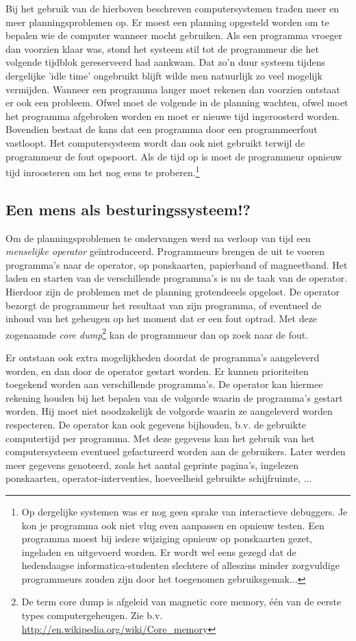 Bij het gebruik van de hierboven beschreven computersystemen
traden meer en meer planningsproblemen op. Er moest een planning
opgesteld worden om te bepalen wie de computer wanneer mocht
gebruiken. Als een programma vroeger dan voorzien klaar was, stond het
systeem stil tot de programmeur die het volgende tijdblok gereserveerd
had aankwam. Dat zo'n duur systeem tijdens dergelijke 'idle time'
ongebruikt blijft wilde men natuurlijk zo veel mogelijk vermijden.
Wanneer een programma langer moet rekenen dan voorzien ontstaat er ook
een probleem. Ofwel moet de volgende in de planning wachten, ofwel
moet het programma afgebroken worden en moet er nieuwe tijd
ingeroosterd worden. Bovendien bestaat de kans dat een programma door
een programmeerfout vastloopt. Het computersysteem wordt dan ook niet
gebruikt terwijl de programmeur de fout opspoort. Als de tijd op is
moet de programmeur opnieuw tijd inroosteren om het nog eens te
proberen.\footnote{Op dergelijke systemen was er nog geen sprake van
interactieve debuggers. Je kon je programma ook niet vlug even
aanpassen en opnieuw testen. Een programma moest bij iedere
wijziging opnieuw op ponskaarten gezet, ingeladen en uitgevoerd
worden. Er wordt wel eens gezegd dat de hedendaagse
informatica-studenten slechtere of alleszins minder zorgvuldige
programmeurs zouden zijn door het toegenomen
gebruiksgemak...}

\subsection{Een mens als besturingssysteem!?}

Om de planningsproblemen te ondervangen werd na verloop van tijd
een \emph{menselijke operator} ge\"introduceerd.
Programmeurs brengen de uit te voeren programma's naar de operator, op
ponskaarten, papierband of magneetband. Het laden en starten van de
verschillende programma's is nu de taak van de operator. Hierdoor zijn
de problemen met de planning grotendeeels opgelost. De operator
bezorgt de programmeur het resultaat van zijn programma, of eventueel
de inhoud van het geheugen op het moment dat er een fout optrad. Met
deze zogenaamde \emph{core dump}\footnote{De term core dump is
afgeleid van magnetic core memory, \'e\'en van de eerste types computergeheugen.
Zie b.v. \url{http://en.wikipedia.org/wiki/Core_memory}}
kan de programmeur dan op zoek naar de fout.

Er ontstaan ook extra mogelijkheden doordat de programma's
aangeleverd worden, en dan door de operator gestart worden. Er kunnen
prioriteiten toegekend worden aan verschillende programma's. De
operator kan hiermee rekening houden bij het bepalen van de volgorde
waarin de programma's gestart worden. Hij moet niet noodzakelijk de
volgorde waarin ze aangeleverd worden respecteren. De operator kan ook
gegevens bijhouden, b.v. de gebruikte computertijd per programma. Met
deze gegevens kan het gebruik van het computersysteem eventueel
gefactureerd worden aan de gebruikers. Later werden meer gegevens
genoteerd, zoals het aantal geprinte pagina's, ingelezen ponskaarten,
operator-interventies, hoeveelheid gebruikte schijfruimte, ...

